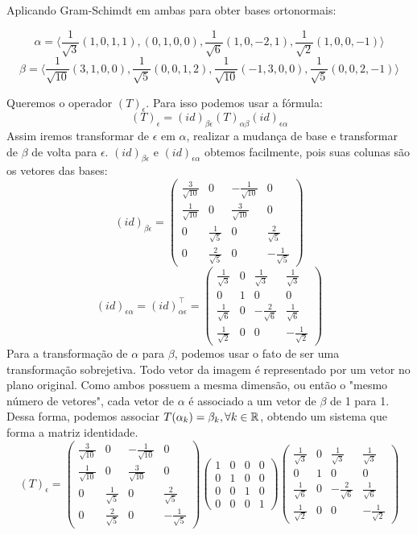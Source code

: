 \documentclass{homework}
\begin{document}
Aplicando Gram-Schimdt em ambas para obter bases ortonormais:

\[\alpha = \langle\frac{1}{\sqrt{3}}(1,0,1,1),(0,1,0,0),\frac{1}{\sqrt{6}}(1,0,-2,1),\frac{1}{\sqrt{2}}(1,0,0,-1)\rangle\]
\[\beta = \langle\frac{1}{\sqrt{10}}(3,1,0,0),\frac{1}{\sqrt{5}}(0,0,1,2),\frac{1}{\sqrt{10}}(-1,3,0,0),\frac{1}{\sqrt{5}}(0,0,2,-1)\rangle\]

Queremos o operador $(T)_\epsilon$. Para isso podemos usar a fórmula:
\[(T)_\epsilon = (id)_{\beta\epsilon}(T)_{\alpha\beta}(id)_{\epsilon\alpha}\]
Assim iremos transformar de $\epsilon$ em $\alpha$, realizar a mudança de base e transformar de $\beta$ de volta para $\epsilon$. $(id)_{\beta\epsilon}$ e $(id)_{\epsilon\alpha}$ obtemos facilmente, pois suas colunas são os vetores das bases:
\[(id)_{\beta\epsilon} = 
\begin{pmatrix}\frac{3}{\sqrt{10}} & 0 & -\frac{1}{\sqrt{10}} & 0\\
\frac{1}{\sqrt{10}} & 0 & \frac{3}{\sqrt{10}} & 0\\
0 & \frac{1}{\sqrt{5}} & 0 & \frac{2}{\sqrt{5}}\\
0 & \frac{2}{\sqrt{5}} & 0 & -\frac{1}{\sqrt{5}}\end{pmatrix}\]
\[(id)_{\epsilon\alpha} = (id)_{\alpha\epsilon}^\top = \begin{pmatrix}\frac{1}{\sqrt{3}} & 0 & \frac{1}{\sqrt{3}} & \frac{1}{\sqrt{3}}\\
0 & 1 & 0 & 0\\
\frac{1}{\sqrt{6}} & 0 & -\frac{2}{\sqrt{6}} & \frac{1}{\sqrt{6}}\\
\frac{1}{\sqrt{2}} & 0 & 0 & -\frac{1}{\sqrt{2}}\end{pmatrix}\]
Para a transformação de $\alpha$ para $\beta$, podemos usar o fato de ser uma transformação sobrejetiva. Todo vetor da imagem é representado por um vetor no plano original. Como ambos possuem a mesma dimensão, ou então o "mesmo número de vetores", cada vetor de $\alpha$ é associado a um vetor de $\beta$ de 1 para 1. Dessa forma, podemos associar $T(\alpha_k) = \beta_k, \forall k \in \mathbb R$, obtendo um sistema que forma a matriz identidade.
\[(T)_\epsilon = \begin{pmatrix}\frac{3}{\sqrt{10}} & 0 & -\frac{1}{\sqrt{10}} & 0\\
\frac{1}{\sqrt{10}} & 0 & \frac{3}{\sqrt{10}} & 0\\
0 & \frac{1}{\sqrt{5}} & 0 & \frac{2}{\sqrt{5}}\\
0 & \frac{2}{\sqrt{5}} & 0 & -\frac{1}{\sqrt{5}}\end{pmatrix}
\begin{pmatrix}
1 & 0 & 0 & 0\\
0 & 1 & 0 & 0\\
0 & 0 & 1 & 0\\
0 & 0 & 0 & 1
\end{pmatrix}\begin{pmatrix}\frac{1}{\sqrt{3}} & 0 & \frac{1}{\sqrt{3}} & \frac{1}{\sqrt{3}}\\
0 & 1 & 0 & 0\\
\frac{1}{\sqrt{6}} & 0 & -\frac{2}{\sqrt{6}} & \frac{1}{\sqrt{6}}\\
\frac{1}{\sqrt{2}} & 0 & 0 & -\frac{1}{\sqrt{2}}\end{pmatrix}\]
\end{document}
